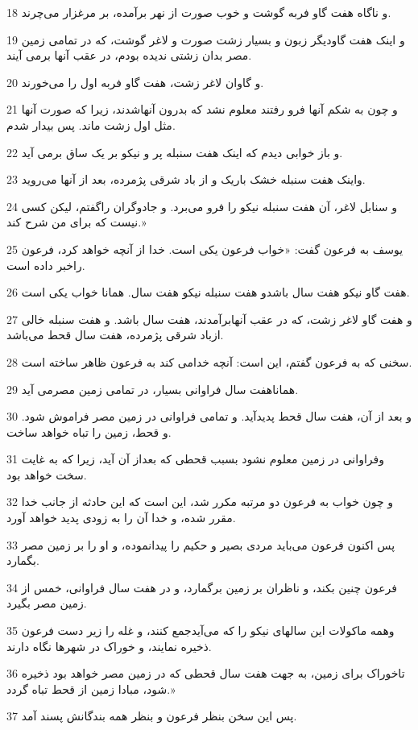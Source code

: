 \par 18 و ناگاه هفت گاو فربه گوشت و خوب صورت از نهر برآمده، بر مرغزار می‌چرند. 
\par 19 و اینک هفت گاودیگر زبون و بسیار زشت صورت و لاغر گوشت، که در تمامی زمین مصر بدان زشتی ندیده بودم، در عقب آنها برمی آیند.
\par 20 و گاوان لاغر زشت، هفت گاو فربه اول را می‌خورند.
\par 21 و چون به شکم آنها فرو رفتند معلوم نشد که بدرون آنهاشدند، زیرا که صورت آنها مثل اول زشت ماند. پس بیدار شدم.
\par 22 و باز خوابی دیدم که اینک هفت سنبله پر و نیکو بر یک ساق برمی آید.
\par 23 واینک هفت سنبله خشک باریک و از باد شرقی پژمرده، بعد از آنها می‌روید.
\par 24 و سنابل لاغر، آن هفت سنبله نیکو را فرو می‌برد. و جادوگران راگفتم، لیکن کسی نیست که برای من شرح کند.»
\par 25 یوسف به فرعون گفت: «خواب فرعون یکی است. خدا از آنچه خواهد کرد، فرعون راخبر داده است.
\par 26 هفت گاو نیکو هفت سال باشدو هفت سنبله نیکو هفت سال. همانا خواب یکی است.
\par 27 و هفت گاو لاغر زشت، که در عقب آنهابرآمدند، هفت سال باشد. و هفت سنبله خالی ازباد شرقی پژمرده، هفت سال قحط می‌باشد.
\par 28 سخنی که به فرعون گفتم، این است: آنچه خدامی کند به فرعون ظاهر ساخته است.
\par 29 هماناهفت سال فراوانی بسیار، در تمامی زمین مصرمی آید.
\par 30 و بعد از آن، هفت سال قحط پدیدآید. و تمامی فراوانی در زمین مصر فراموش شود. و قحط، زمین را تباه خواهد ساخت.
\par 31 وفراوانی در زمین معلوم نشود بسبب قحطی که بعداز آن آید، زیرا که به غایت سخت خواهد بود.
\par 32 و چون خواب به فرعون دو مرتبه مکرر شد، این است که این حادثه از جانب خدا مقرر شده، و خدا آن را به زودی پدید خواهد آورد.
\par 33 پس اکنون فرعون می‌باید مردی بصیر و حکیم را پیدانموده، و او را بر زمین مصر بگمارد.
\par 34 فرعون چنین بکند، و ناظران بر زمین برگمارد، و در هفت سال فراوانی، خمس از زمین مصر بگیرد.
\par 35 وهمه ماکولات این سالهای نیکو را که می‌آیدجمع کنند، و غله را زیر دست فرعون ذخیره نمایند، و خوراک در شهرها نگاه دارند.
\par 36 تاخوراک برای زمین، به جهت هفت سال قحطی که در زمین مصر خواهد بود ذخیره شود، مبادا زمین از قحط تباه گردد.»
\par 37 پس این سخن بنظر فرعون و بنظر همه بندگانش پسند آمد.
